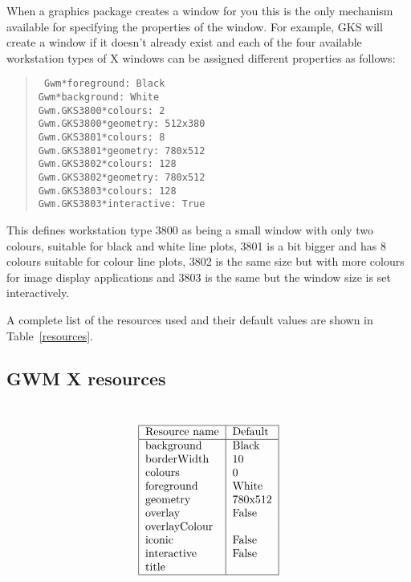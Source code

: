 \documentclass[twoside,11pt]{article}
\renewcommand{\_}{\texttt{\symbol{95}}}
\begin{document}
When a graphics package creates a window for you this is the only mechanism
available for specifying the properties of the window. For example, GKS will
create a window if it doesn't already exist and each of the four available
workstation types of X windows can be assigned different properties as follows:
\begin{quote}{\tt
Gwm*foreground: Black\\
Gwm*background: White\\
Gwm.GKS\_3800*colours: 2\\
Gwm.GKS\_3800*geometry: 512x380\\
Gwm.GKS\_3801*colours: 8\\
Gwm.GKS\_3801*geometry: 780x512\\
Gwm.GKS\_3802*colours: 128\\
Gwm.GKS\_3802*geometry: 780x512\\
Gwm.GKS\_3803*colours: 128\\
Gwm.GKS\_3803*interactive: True}
\end{quote}
This defines workstation type 3800 as being a small window with only two
colours, suitable for black and white line plots, 3801 is a bit bigger and has
8 colours suitable for colour line plots, 3802 is the same size but with more
colours for image display applications and 3803 is the same but the window size
is set interactively.

A complete list of the resources used and their default values are shown in 
Table~\ref{resources}.
\begin{htmlonly}
\subsection{GWM X resources}
\end{htmlonly}
\begin{table}\caption{GWM X resources\label{resources}}\tt
\[\begin{tabular}{|l|l|}\hline
\rm Resource name &\rm Default\\ \hline
background &Black\\
borderWidth &10\\
colours & 0\\
foreground &White\\
geometry &780x512\\
overlay &False\\
overlayColour &\\
iconic &False\\
interactive &False\\
title &\\\hline 
\end{tabular}\]
\end{table}
\end{document}
